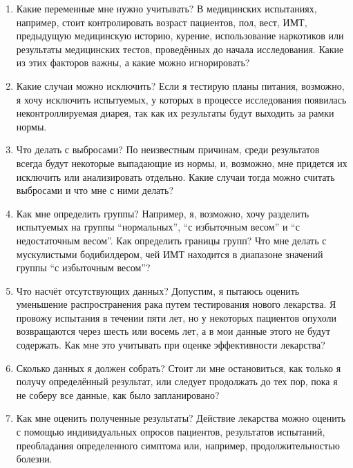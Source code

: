\begin{enumerate}
	\item Какие переменные мне нужно учитывать? В медицинских испытаниях, например, стоит контролировать возраст пациентов, пол, вест, ИМТ, предыдущую медицинскую историю, курение, использование наркотиков или результаты медицинских тестов, проведённых до начала исследования. Какие из этих факторов важны, а какие можно игнорировать?

	\item Какие случаи можно исключить? Если я тестирую планы питания, возможно, я хочу исключить испытуемых, у которых в процессе исследования появилась неконтроллируемая диарея, так как их результаты будут выходить за рамки нормы.

	\item Что делать с выбросами? По неизвестным причинам, среди результатов всегда будут некоторые выпадающие из нормы, и, возможно, мне придется их исключить или анализировать отдельно. Какие случаи тогда можно считать выбросами и что мне с ними делать?

	\item Как мне определить группы? Например, я, возможно, хочу разделить испытуемых на группы ``нормальных'', ``с избыточным весом'' и ``с недостаточным весом''. Как определить границы групп? Что мне делать с мускулистыми бодибилдером, чей ИМТ находится в диапазоне значений группы ``с избыточным весом''?

	\item Что насчёт отсутствующих данных? Допустим, я пытаюсь оценить уменьшение распространения рака путем тестирования нового лекарства. Я провожу испытания в течении пяти лет, но у некоторых пациентов опухоли возвращаются через шесть или восемь лет, а в мои данные этого не будут содержать. Как мне это учитывать при оценке эффективности лекарства? 

	\item Сколько данных я должен собрать? Стоит ли мне остановиться, как только я получу определённый результат, или следует продолжать до тех пор, пока я не соберу все данные, как было запланировано?

	\item Как мне оценить полученные результаты? Действие лекарства можно оценить с помощью индивидуальных опросов пациентов, результатов испытаний, преобладания определенного симптома или, например, продолжительностью болезни.

\end{enumerate}

